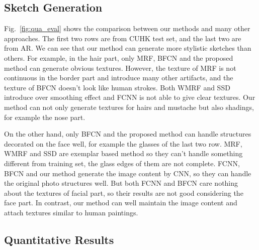\documentclass[10pt,twocolumn,letterpaper]{article}
\begin{document}
\subsection{Sketch Generation} \label{sec:sketch_gen}

Fig.~\ref{fig:qua_eval} shows the comparison between our methods and many other approaches. The first two rows are from CUHK test set, and the last two are from AR. We can see that our method can generate more stylistic sketches than others. For example, in the hair part, only MRF, BFCN and the proposed method can generate obvious textures. However, the texture of MRF is not continuous in the border part and introduce many other artifacts, and the texture of BFCN doesn't look like human strokes. Both WMRF and SSD introduce over smoothing effect and FCNN is not able to give clear textures. Our method can not only generate textures for hairs and mustache but also shadings, for example the nose part.

On the other hand, only BFCN and the proposed method can handle structures decorated on the face well, for example the glasses of the last two row. MRF, WMRF and SSD are exemplar based method so they can't handle something different from training set, the glass edges of them are not complete. FCNN, BFCN and our method generate the image content by CNN, so they can handle the original photo structures well. But both FCNN and BFCN care nothing about the textures of facial part, so their results are not good considering the face part. In contrast, our method can well maintain the image content and attach textures similar to human paintings. 

\subsection{Quantitative Results}
\end{document}

